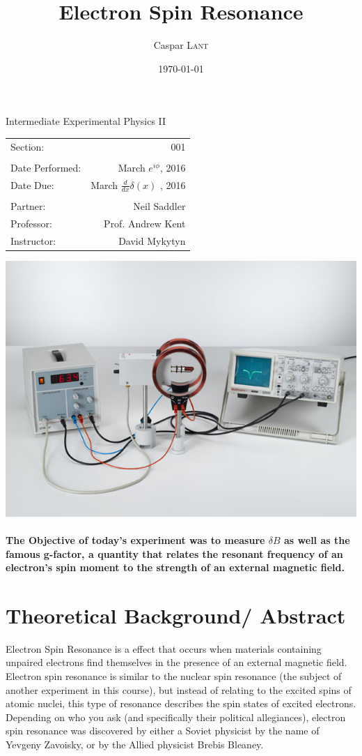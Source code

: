 \documentclass{amsart}
\title{Electron Spin Resonance}
\author{Caspar \textsc{Lant}} %
\date{\today} %
\begin{document}
\bigskip

\maketitle %
\begin{center}

Intermediate Experimental Physics II\\
\vspace{1.5cm}

\begin{tabular}{l r}

Section: & 001\\
\\
Date Performed: & March $e^{i\phi}$, 2016 \\ %
Date Due: & March $ \frac{d}{dx}\delta(x)$ , 2016\\
\\
Partner: & Neil Saddler\\ %
Professor: & Prof. Andrew Kent\\
Instructor: & David Mykytyn %
\end{tabular}
\vfill
\includegraphics[width=.7\textwidth]{diagram.jpg}
\end{center}
\vfill
\pagebreak
{}
\paragraph{\textbf{The Objective} of today's experiment was to measure $\delta B$ as well as the famous g-factor, a quantity that relates the resonant frequency of an electron's spin moment to the strength of an external magnetic field.}

\section{Theoretical Background/ Abstract}
Electron Spin Resonance is a effect that occurs when materials containing unpaired electrons find themselves in the presence of an external magnetic field. Electron spin resonance is similar to the nuclear spin resonance (the subject of another experiment in this course), but instead of relating to the excited spins of atomic nuclei, this type of resonance describes the spin states of excited electrons. Depending on who you ask (and specifically their political allegiances), electron spin resonance was discovered by either a Soviet physicist by the name of Yevgeny Zavoisky, or by the Allied physicist Brebis Bleaney.
\end{document}
